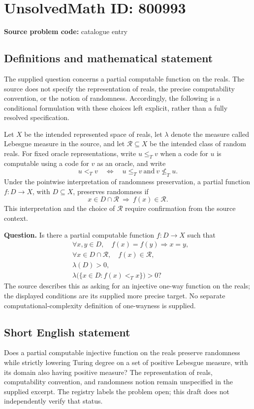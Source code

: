 \documentclass[11pt]{article}
\begin{document}
\section*{UnsolvedMath ID: 800993}
\textbf{Source problem code:} catalogue entry
\subsection{Definitions and mathematical statement}
The supplied question concerns a partial computable function on the reals. The source does not specify the representation of reals, the precise computability convention, or the notion of randomness. Accordingly, the following is a conditional formulation with these choices left explicit, rather than a fully resolved specification.

Let \(X\) be the intended represented space of reals, let \(\lambda\) denote the measure called Lebesgue measure in the source, and let \(\mathcal R\subseteq X\) be the intended class of random reals. For fixed oracle representations, write \(u\leq_T v\) when a code for \(u\) is computable using a code for \(v\) as an oracle, and write
\[
 u<_T v\quad\Longleftrightarrow\quad u\leq_T v\ \text{and}\ v\not\leq_T u.
\]
Under the pointwise interpretation of randomness preservation, a partial function \(f:D\to X\), with \(D\subseteq X\), preserves randomness if
\[
 x\in D\cap\mathcal R\ \Longrightarrow\ f(x)\in\mathcal R.
\]
This interpretation and the choice of \(\mathcal R\) require confirmation from the source context.

\textbf{Question.} Is there a partial computable function \(f:D\to X\) such that
\begin{align*}
 &\forall x,y\in D,\quad f(x)=f(y)\Longrightarrow x=y,\\
 &\forall x\in D\cap\mathcal R,\quad f(x)\in\mathcal R,\\
 &\lambda(D)>0,\\
 &\lambda\bigl(\{x\in D:f(x)<_T x\}\bigr)>0?
\end{align*}
The source describes this as asking for an injective one-way function on the reals; the displayed conditions are its supplied more precise target. No separate computational-complexity definition of one-wayness is supplied.
\subsection{Short English statement}
Does a partial computable injective function on the reals preserve randomness while strictly lowering Turing degree on a set of positive Lebesgue measure, with its domain also having positive measure? The representation of reals, computability convention, and randomness notion remain unspecified in the supplied excerpt. The registry labels the problem open; this draft does not independently verify that status.
\end{document}
